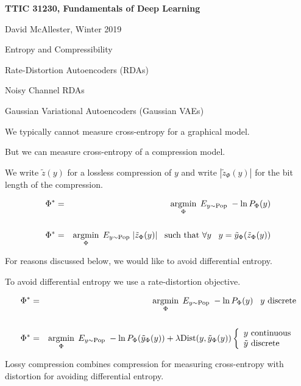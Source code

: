 





{\Huge

  \centerline{\bf TTIC 31230, Fundamentals of Deep Learning}
  \bigskip
  \centerline{David McAllester, Winter 2019}
  \vfill
  \centerline{Entropy and Compressibility}
  \vfill
  \centerline{Rate-Distortion Autoencoders (RDAs)}
  \vfill
  \centerline{Noisy Channel RDAs}
  \vfill
  \centerline{Gaussian Variational Autoencoders (Gaussian VAEs)}


We typically cannot measure cross-entropy for a graphical model.

\vfill
But we can measure cross-entropy of a compression model.

\vfill
We write $\tilde{z}(y)$ for a lossless compression of $y$ and write $|\tilde{z}_\Phi(y)|$ for the bit length of the compression.

\vfill
{\color{red}
\begin{eqnarray*}
\Phi^* & = & \operatorname*{argmin}_\Phi \;E_{y \sim \mathrm{Pop}} \;-\ln P_\Phi(y) \\
\\
\Phi^* & = & \operatorname*{argmin}_\Phi \;E_{y \sim \mathrm{Pop}} \;|\tilde{z}_\Phi(y)|\;\;\;\mbox{such that $\forall y\;\;\;y = \tilde{y}_\Phi(\tilde{z}_\Phi(y))$}
\end{eqnarray*}
}


For reasons discussed below, we would like to avoid differential entropy.

\vfill
To avoid differential entropy we use a rate-distortion objective.

\vfill
{\color{red} \huge
\begin{eqnarray*}
\Phi^* & = & \operatorname*{argmin}_\Phi \;E_{y \sim \mathrm{Pop}} \;-\ln P_\Phi(y)\;\;\;\mbox{$y$ discrete} \\
\\
\Phi^* & = & \operatorname*{argmin}_\Phi \;E_{y \sim \mathrm{Pop}} \;-\ln P_\Phi(\tilde{y}_\Phi(y)) + \lambda \mathrm{Dist}(y,\tilde{y}_\Phi(y))
\left\{\begin{array}{l}\mbox{$y$ continuous} \\ \mbox{$\tilde{y}$ discrete}\end{array}\right.
\end{eqnarray*}
}


Lossy compression combines compression for measuring cross-entropy with distortion for avoiding differential entropy.

}
